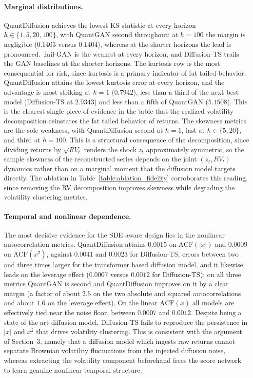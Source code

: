 \documentclass[sigconf,natbib=false]{acmart}
\begin{document}
\paragraph{Marginal distributions.}
QuantDiffusion achieves the lowest KS statistic at every horizon $h \in \{1, 5, 20, 100\}$, with QuantGAN second throughout; at $h = 100$ the margin is negligible ($0.1403$ versus $0.1404$), whereas at the shorter horizons the lead is pronounced. Tail-GAN is the weakest at every horizon, and Diffusion-TS trails the GAN baselines at the shorter horizons. The kurtosis row is the most consequential for risk, since kurtosis is a primary indicator of fat tailed behavior. QuantDiffusion attains the lowest kurtosis error at every horizon, and the advantage is most striking at $h = 1$ ($0.7942$), less than a third of the next best model (Diffusion-TS at $2.9343$) and less than a fifth of QuantGAN ($5.1508$). This is the clearest single piece of evidence in the table that the realized volatility decomposition reinstates the fat tailed behavior of returns. The skewness metrics are the sole weakness, with QuantDiffusion second at $h = 1$, last at $h \in \{5, 20\}$, and third at $h = 100$. This is a structural consequence of the decomposition, since dividing returns by $\sqrt{RV_t}$ renders the shock $z_t$ approximately symmetric, so the sample skewness of the reconstructed series depends on the joint $(z_t, RV_t)$ dynamics rather than on a marginal moment that the diffusion model targets directly. The ablation in Table~\ref{table:ablation_fidelity} corroborates this reading, since removing the RV decomposition improves skewness while degrading the volatility clustering metrics.

\paragraph{Temporal and nonlinear dependence.}
The most decisive evidence for the SDE aware design lies in the nonlinear autocorrelation metrics. QuantDiffusion attains $0.0015$ on $\mathrm{ACF}(|x|)$ and $0.0009$ on $\mathrm{ACF}(x^{2})$, against $0.0041$ and $0.0023$ for Diffusion-TS, errors between two and three times larger for the transformer based diffusion model, and it likewise leads on the leverage effect ($0.0007$ versus $0.0012$ for Diffusion-TS); on all three metrics QuantGAN is second and QuantDiffusion improves on it by a clear margin (a factor of about $2.5$ on the two absolute and squared autocorrelations and about $1.6$ on the leverage effect). On the linear $\mathrm{ACF}(x)$ all models are effectively tied near the noise floor, between $0.0007$ and $0.0012$. Despite being a state of the art diffusion model, Diffusion-TS fails to reproduce the persistence in $|x|$ and $x^{2}$ that drives volatility clustering. This is consistent with the argument of Section~3, namely that a diffusion model which ingests raw returns cannot separate Brownian volatility fluctuations from the injected diffusion noise, whereas extracting the volatility component beforehand frees the score network to learn genuine nonlinear temporal structure.
\end{document}
